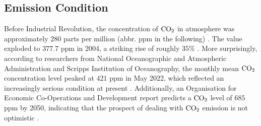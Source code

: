 \documentclass[12pt,a4paper]{article}
\begin{document}
    \subsection{Emission Condition}
    
    Before Industrial Revolution, the concentration of $\ce{CO2}$ in atmosphere was approximately $280$ parts per million (abbr. ppm in the following) \autocite{neftel_evidence_1985}. The value exploded to $377.7$ ppm in 2004, a striking rise of roughly $35\%$ \autocite{dr_pieter_tans_trends_2022}. More surprisingly, according to researchers from National Oceanographic and Atmospheric Administration and Scripps Institution of Oceanography, the monthly mean $\ce{CO2}$ concentration level peaked at $421$ ppm in May 2022, which reflected an increasingly serious condition at present \autocite{national_oceanographic_and_atmospheric_administration_carbon_2022}. Additionally, an Organisation for Economic Co-Operations and Development report predicts a $\ce{CO2}$ level of $685$ ppm by 2050, indicating that the prospect of dealing with $\ce{CO2}$ emission is not optimistic \autocite{organisation_for_economic_co-operations_and_development_oecd_2012}.
\end{document}
